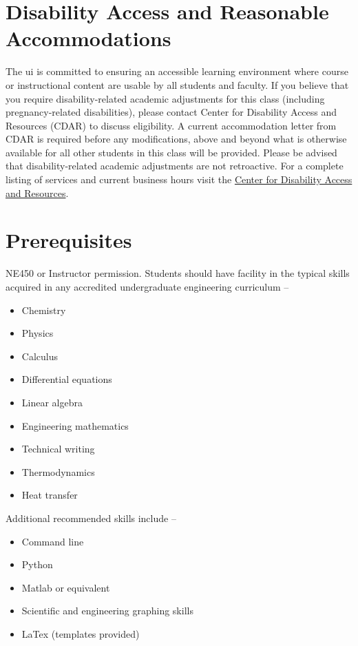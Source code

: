\documentclass[11pt,letterpaper]{article}
\newcommand{\acl}{\acrlong} %
\begin{document}
\section{Disability Access and Reasonable Accommodations}
The \acl{ui} is committed to ensuring an accessible learning environment where course or instructional content are usable by all students and faculty. If you believe that you require disability-related academic adjustments for this class (including pregnancy-related disabilities), please contact Center for Disability Access and Resources (CDAR) to discuss eligibility. A current accommodation letter from CDAR is required before any modifications, above and beyond what is otherwise available for all other students in this class will be provided. Please be advised that disability-related academic adjustments are not retroactive. For a complete listing of services and current business hours visit the \href{https://www.uidaho.edu/current-students/cdar}{Center for Disability Access and Resources}.


\section{Prerequisites}
NE450 or Instructor permission. Students should have facility in the typical skills acquired in any accredited undergraduate engineering curriculum --
\begin{itemize}[begin-vspace=0ex,item-vspace=-0.5ex,begin-extra-vspace=1ex,para-vspace=1ex,left-margin=2.25ex,item-indent=0ex]
    \item Chemistry
    \item Physics
    \item Calculus
    \item Differential equations
    \item Linear algebra
    \item Engineering mathematics
    \item Technical writing
    \item Thermodynamics
    \item Heat transfer
\end{itemize}

Additional recommended skills include -- 
\begin{itemize}[begin-vspace=0ex,item-vspace=-0.5ex,begin-extra-vspace=1ex,para-vspace=1ex,left-margin=2.25ex,item-indent=0ex]
    \item Command line
    \item Python
    \item Matlab or equivalent
    \item Scientific and engineering graphing skills
    \item LaTex (templates provided)
\end{itemize}
\end{document}
